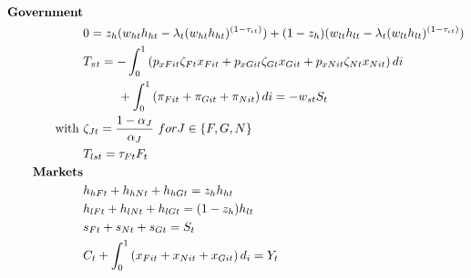\begin{align}
\text{\textbf{Government}}&\nonumber\\
&0=z_h(w_{ht}h_{ht}-\lambda_t(w_{ht}h_{ht})^{(1-\tau_{\iota t})}) +(1-z_h)(w_{lt}h_{lt}-\lambda_t(w_{lt}h_{lt})^{(1-\tau_{\iota t})})\nonumber\\
&T_{\pi t}= -\int_{0}^{1} \left(p_{xFit}\zeta_{Ft}x_{Fit}+p_{xGit}\zeta_{Gt}x_{Git}+ p_{xNit}\zeta_{Nt}x_{Nit}\right)di\nonumber\\ &\hspace{10mm}+\int_{0}^{1}\left(\pi_{Fit}+\pi_{Git}+\pi_{Nit}\right)di = -w_{st}S_t\nonumber\\
\text{with}\ \vspace{4mm}&\zeta_{Jt}=\frac{1-\alpha_J}{\alpha_J}\ for J\in\{F,G,N\}\nonumber \\
& T_{lst}=\tau_{Ft}F_t\nonumber\\
\text{\textbf{Markets}}&\nonumber\\
&h_{hFt}+h_{hNt}+h_{hGt}=z_{h} h_{ht}\nonumber\\
&h_{lFt}+h_{lNt}+h_{lGt}=(1-z_h) h_{lt}\nonumber\\
&s_{Ft}+s_{Nt}+s_{Gt}=S_{t}\nonumber\\
&C_{t}+\int_{0}^{1} \left(x_{Fit}+x_{Nit}+x_{Git}\right)d_i=Y_t\nonumber
\end{align}

